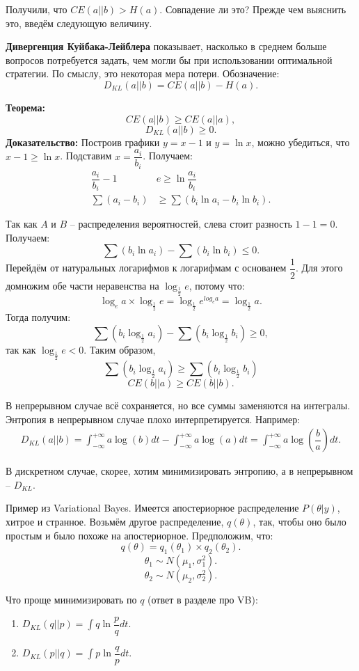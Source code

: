 \documentclass[10pt, a4paper]{extarticle}
\begin{document}
Получили, что $CE(a||b) > H(a)$. Совпадение ли это? Прежде чем выяснить это, введём следующую величину.

\textbf{Дивергенция Куйбака-Лейблера} показывает, насколько в среднем больше вопросов потребуется задать, чем могли бы при использовании оптимальной стратегии. По смыслу, это некоторая мера потери. Обозначение:
\[
D_{KL}(a||b) = CE(a||b) - H(a).
\]

\textbf{Теорема:}
\[
CE(a||b) \ge CE(a||a),
\]
\[
D_{KL}(a||b) \ge 0.
\]
\textbf{Доказательство:}
Построив графики $y=x-1$ и $y=\ln x$, можно убедиться, что $x-1 \ge \ln x$. Подставим $x = \dfrac{a_i}{b_i}$. Получаем:
\begin{align*}
	\dfrac{a_i}{b_i} - 1 &e\ge \ln\dfrac{a_i}{b_i} \\
	\sum(a_i - b_i)&\ge \sum(b_i\ln a_i - b_i \ln b_i).
\end{align*}

Так как $A$ и $B$ -- распределения вероятностей, слева стоит разность $1 - 1 = 0$. Получаем:
\[
\sum(b_i\ln a_i) - \sum(b_i \ln b_i) \le 0.
\]
Перейдём от натуральных логарифмов к логарифмам с основанем $\dfrac{1}{2}$. Для этого домножим обе части неравенства на $\log_{\frac{1}{2}}e$, потому что:
\[
\log_e a \times \log_{\frac{1}{2}}e = \log_{\frac{1}{2}}e^{log_e a} = \log_{\frac{1}{2}}a.
\]
Тогда получим:
\[
\sum(b_i  \log_{\frac{1}{2}} a_i) - \sum(b_i  \log_{\frac{1}{2}} b_i) \ge 0,
\]
так как $ \log_{\frac{1}{2}}e < 0$. Таким образом,
\[
\sum(b_i  \log_{\frac{1}{2}} a_i) \ge \sum(b_i  \log_{\frac{1}{2}} b_i)
\]
\[
CE(b||a) \ge CE(b||b).
\]

В непрерывном случае всё сохраняется, но все суммы заменяются на интегралы. Энтропия в непрерывном случае плохо интерпретируется. Например:
\begin{align*}
D_{KL}(a||b) = \int_{-\infty}^{+\infty}a\log(b) dt - \int_{-\infty}^{+\infty}a\log(a) dt = \int_{-\infty}^{+\infty}a\log (\dfrac{b}{a}) dt.
\end{align*}

В дискретном случае, скорее, хотим минимизировать энтропию, а в непрерывном -- $D_{KL}$.

Пример из Variational Bayes. Имеется апостериорное распределение $P(\theta|y)$, хитрое и странное. Возьмём другое распределение, $q(\theta)$, так, чтобы оно было простым и было похоже на апостериорное. Предположим, что:
\[
q(\theta) = q_1(\theta_1) \times q_2(\theta_2).
\] 
\[
\theta_1 \sim N(\mu_1, \sigma_1^2).
\]
\[
\theta_2 \sim N(\mu_2, \sigma_2^2).
\]

Что проще минимизировать по $q$ (ответ в разделе про VB):
\begin{enumerate}
	\item $D_{KL}(q||p) = \int q \ln \dfrac{p}{q}dt$.
	\item $D_{KL}(p||q) = \int p \ln \dfrac{q}{p}dt$.
\end{enumerate}
\end{document}
